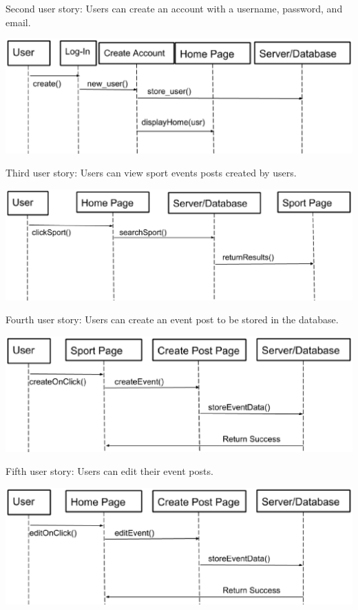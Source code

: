 \documentclass[a4paper]{article}
\begin{document}
Second user story: Users can create an account with a username, password, and email.

\includegraphics[width=\textwidth]{createAccount}

Third user story: Users can view sport events posts created by users.

\includegraphics[width=\textwidth]{viewSport}

Fourth user story: Users can create an event post to be stored in the database.

\includegraphics[width=\textwidth]{createEvent}

Fifth user story: Users can edit their event posts.

\includegraphics[width=\textwidth]{editEvent}
\end{document}
